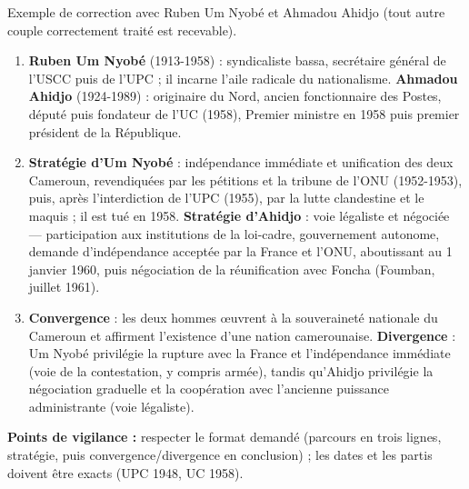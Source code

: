 \documentclass[11pt]{article}
\begin{document}
\begin{corrige}
Exemple de correction avec Ruben Um Nyobé et Ahmadou Ahidjo (tout autre couple correctement traité est recevable).
\begin{enumerate}
\item \textbf{Ruben Um Nyobé} (1913-1958) : syndicaliste bassa, secrétaire général de l'USCC puis de l'UPC ; il incarne l'aile radicale du nationalisme. \textbf{Ahmadou Ahidjo} (1924-1989) : originaire du Nord, ancien fonctionnaire des Postes, député puis fondateur de l'UC (1958), Premier ministre en 1958 puis premier président de la République.
\item \textbf{Stratégie d'Um Nyobé} : indépendance immédiate et unification des deux Cameroun, revendiquées par les pétitions et la tribune de l'ONU (1952-1953), puis, après l'interdiction de l'UPC (1955), par la lutte clandestine et le maquis ; il est tué en 1958. \textbf{Stratégie d'Ahidjo} : voie légaliste et négociée — participation aux institutions de la loi-cadre, gouvernement autonome, demande d'indépendance acceptée par la France et l'ONU, aboutissant au 1\ier{} janvier 1960, puis négociation de la réunification avec Foncha (Foumban, juillet 1961).
\item \textbf{Convergence} : les deux hommes œuvrent à la souveraineté nationale du Cameroun et affirment l'existence d'une nation camerounaise. \textbf{Divergence} : Um Nyobé privilégie la rupture avec la France et l'indépendance immédiate (voie de la contestation, y compris armée), tandis qu'Ahidjo privilégie la négociation graduelle et la coopération avec l'ancienne puissance administrante (voie légaliste).
\end{enumerate}
\textbf{Points de vigilance :} respecter le format demandé (parcours en trois lignes, stratégie, puis convergence/divergence en conclusion) ; les dates et les partis doivent être exacts (UPC 1948, UC 1958).
\end{corrige}
\end{document}
